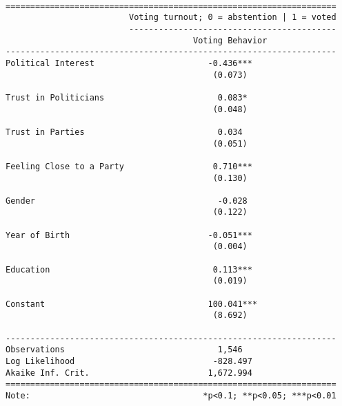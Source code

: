 \documentclass[
  letterpaper,
  DIV=11,
  numbers=noendperiod]{scrreprt}
\begin{document}
\begin{verbatim}

===================================================================
                         Voting turnout; 0 = abstention | 1 = voted
                         ------------------------------------------
                                      Voting Behavior              
-------------------------------------------------------------------
Political Interest                       -0.436***                 
                                          (0.073)                  
                                                                   
Trust in Politicians                       0.083*                  
                                          (0.048)                  
                                                                   
Trust in Parties                           0.034                   
                                          (0.051)                  
                                                                   
Feeling Close to a Party                  0.710***                 
                                          (0.130)                  
                                                                   
Gender                                     -0.028                  
                                          (0.122)                  
                                                                   
Year of Birth                            -0.051***                 
                                          (0.004)                  
                                                                   
Education                                 0.113***                 
                                          (0.019)                  
                                                                   
Constant                                 100.041***                
                                          (8.692)                  
                                                                   
-------------------------------------------------------------------
Observations                               1,546                   
Log Likelihood                            -828.497                 
Akaike Inf. Crit.                        1,672.994                 
===================================================================
Note:                                   *p<0.1; **p<0.05; ***p<0.01
\end{verbatim}
\end{document}
